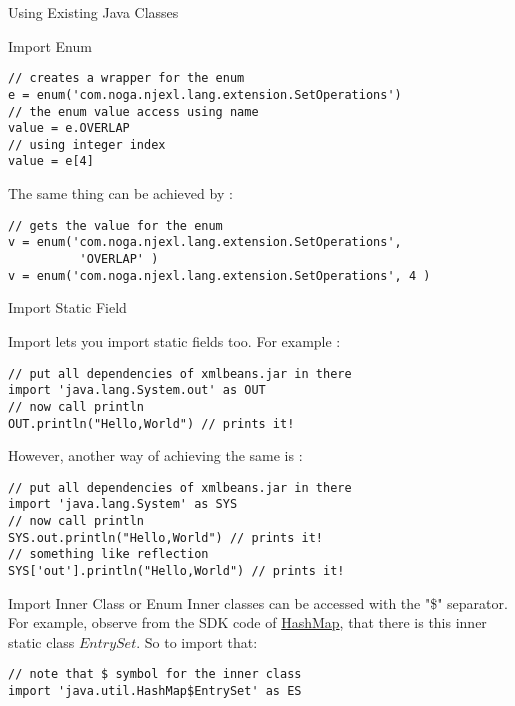 \begin{section}{Using Existing Java Classes}
\begin{subsection}{Import Enum}
\begin{center}\begin{minipage}{\linewidth}
\begin{lstlisting}[style=JexlStyle]
// creates a wrapper for the enum 
e = enum('com.noga.njexl.lang.extension.SetOperations')
// the enum value access using name 
value = e.OVERLAP
// using integer index 
value = e[4] 
\end{lstlisting}
\end{minipage}\end{center}

The same thing can be achieved by :

\begin{lstlisting}[style=JexlStyle]
// gets the value for the enum 
v = enum('com.noga.njexl.lang.extension.SetOperations', 
          'OVERLAP' )
v = enum('com.noga.njexl.lang.extension.SetOperations', 4 )
\end{lstlisting}

\end{subsection}



\begin{subsection}{Import Static Field}

Import lets you import static fields too. For example :

\begin{lstlisting}[style=JexlStyle]
// put all dependencies of xmlbeans.jar in there
import 'java.lang.System.out' as OUT
// now call println 
OUT.println("Hello,World") // prints it!
\end{lstlisting}

However, another way of achieving the same is :

\begin{lstlisting}[style=JexlStyle]
// put all dependencies of xmlbeans.jar in there
import 'java.lang.System' as SYS
// now call println 
SYS.out.println("Hello,World") // prints it!
// something like reflection
SYS['out'].println("Hello,World") // prints it!
\end{lstlisting}

\end{subsection}

\begin{subsection}{Import Inner Class or Enum}
Inner classes can be accessed with the "\$" separator.
For example, observe from the SDK code of 
\href{http://grepcode.com/file/repository.grepcode.com/java/root/jdk/openjdk/8u40-b25/java/util/HashMap.java/}{HashMap},
that there is this inner static class $EntrySet$. So to import that:

\begin{lstlisting}[style=JexlStyle]
// note that $ symbol for the inner class
import 'java.util.HashMap$EntrySet' as ES
\end{lstlisting}

\end{subsection}

\end{section}

